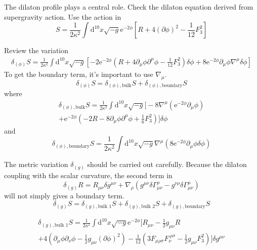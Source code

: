 
The dilaton profile plays a central role.
Check the dilaton equation derived from supergravity action.
Use the action in 
\begin{equation}
	S = \frac{1}{2\kappa^2} \int \mathrm{d}^{10} x \sqrt{-g}
	\mathrm{e}^{-2\phi} \left[ R + 4(\partial\phi)^2 - \frac{1}{12} F_3^2 \right] 
\end{equation}

Review the variation
\begin{align*}
	\delta_{(\phi)} S = \frac{1}{2\kappa^2} \int \mathrm{d}^{10} x \sqrt{-g}
	\left[ -2 \mathrm{e}^{-2\phi} (R+4\partial_\mu\phi \partial^\mu\phi
	-\frac{1}{12}F_3^2)\delta\phi 
+ 8 \mathrm{e}^{-2\phi} \partial_\mu\phi \nabla^\mu\delta\phi\right] 
\end{align*}
To get the boundary term, it's important to use $\nabla_\mu$.
\begin{equation}
	\delta_{(\phi)} S = \delta_{(\phi),\text{bulk}}S
+	\delta_{(\phi),\text{boundary}}S
\end{equation}
where
\begin{align*}
	\delta_{(\phi),\text{bulk}}S = \frac{1}{2\kappa^2} \int \mathrm{d}^{10} x \sqrt{-g}
	\Big[ -8 \nabla^\mu (\mathrm{e}^{-2\phi} \partial_\mu\phi)\\
	+\mathrm{e}^{-2\phi}(-2R - 8 \partial_\mu\phi\partial^\mu\phi
+\frac{1}{6}F_3^2)\Big] \delta\phi
\end{align*}
and
\begin{equation*}
	\delta_{(\phi),\text{boundary}}S = \frac{1}{2\kappa^2} \int \mathrm{d}^{10} x \sqrt{-g}
	\nabla^\mu (8 \mathrm{e}^{-2\phi} \partial_\mu\phi \delta\phi)
\end{equation*}

The metric variation $\delta_{(g)}$ should be carried out carefully.
Because the dilaton coupling with the scalar curvature,
the second term in
\[
	\delta_{(g)} R = R_{\mu \nu} \delta g^{\mu\nu}
	+ \nabla_\rho (g^{\mu\nu} \delta \Gamma^\rho_{\mu\nu}
	- g^{\nu\rho}\delta\Gamma^\mu_{\mu\nu})
\] 
will not simply gives a boundary term.
\begin{equation}
	\delta_{(g)}S = \delta_{(g),\text{bulk 1}} S
	+ \delta_{(g), \text{bulk 2}} S
	+ \delta_{(g), \text{boundary}} S
\end{equation}

\begin{gather*}
	\delta_{(g),\text{bulk 1}} S = \frac{1}{2\kappa^2} \int \mathrm{d}^{10} x \sqrt{-g}
	\mathrm{e}^{-2\phi} \bigg[ R_{\mu\nu} - \frac{1}{2}g_{\mu\nu} R
		\\
 +4 \left( \partial_\mu \phi \partial_\nu \phi 
 -\frac{1}{2} g_{\mu\nu}(\partial\phi)^2\right) 
-\frac{1}{12} \left( 3 F_{\mu\rho\sigma}F^{~\rho\sigma}_{\nu}-\frac{1}{2} g_{\mu\nu} F_3^2 \right) \bigg]
\delta g^{\mu\nu}
\end{gather*}

